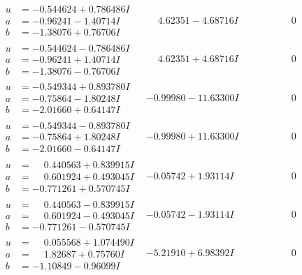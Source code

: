 \documentclass[1p]{elsarticle_modified}
\theoremstyle{definition}
\begin{document}
$$\begin{array}{c|c|c}
\begin{aligned}
u &= -0.544624 + 0.786486 I \\
a &= -0.96241 - 1.40714 I \\
b &= -1.38076 + 0.76706 I\end{aligned}
 & \phantom{-}4.62351 - 4.68716 I & \phantom{-0.000000 } 0 \\ \hline\begin{aligned}
u &= -0.544624 - 0.786486 I \\
a &= -0.96241 + 1.40714 I \\
b &= -1.38076 - 0.76706 I\end{aligned}
 & \phantom{-}4.62351 + 4.68716 I & \phantom{-0.000000 } 0 \\ \hline\begin{aligned}
u &= -0.549344 + 0.893780 I \\
a &= -0.75864 - 1.80248 I \\
b &= -2.01660 + 0.64147 I\end{aligned}
 & -0.99980 - 11.63300 I & \phantom{-0.000000 } 0 \\ \hline\begin{aligned}
u &= -0.549344 - 0.893780 I \\
a &= -0.75864 + 1.80248 I \\
b &= -2.01660 - 0.64147 I\end{aligned}
 & -0.99980 + 11.63300 I & \phantom{-0.000000 } 0 \\ \hline\begin{aligned}
u &= \phantom{-}0.440563 + 0.839915 I \\
a &= \phantom{-}0.601924 + 0.493045 I \\
b &= -0.771261 + 0.570745 I\end{aligned}
 & -0.05742 + 1.93114 I & \phantom{-0.000000 } 0 \\ \hline\begin{aligned}
u &= \phantom{-}0.440563 - 0.839915 I \\
a &= \phantom{-}0.601924 - 0.493045 I \\
b &= -0.771261 - 0.570745 I\end{aligned}
 & -0.05742 - 1.93114 I & \phantom{-0.000000 } 0 \\ \hline\begin{aligned}
u &= \phantom{-}0.055568 + 1.074490 I \\
a &= \phantom{-}1.82687 + 0.75760 I \\
b &= -1.10849 - 0.96099 I\end{aligned}
 & -5.21910 + 6.98392 I & \phantom{-0.000000 } 0 \\ \hline\begin{aligned}

\end{aligned}
\end{array}$$
\end{document}
